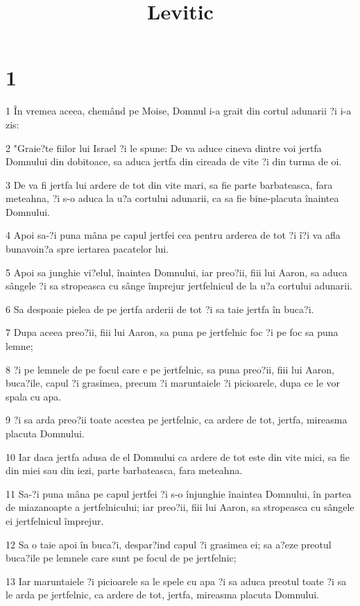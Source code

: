 

\title{Levitic}


\chapter{1}

\par 1 În vremea aceea, chemând pe Moise, Domnul i-a grait din cortul adunarii ?i i-a zis:
\par 2 "Graie?te fiilor lui Israel ?i le spune: De va aduce cineva dintre voi jertfa Domnului din dobitoace, sa aduca jertfa din cireada de vite ?i din turma de oi.
\par 3 De va fi jertfa lui ardere de tot din vite mari, sa fie parte barbateasca, fara meteahna, ?i s-o aduca la u?a cortului adunarii, ca sa fie bine-placuta înaintea Domnului.
\par 4 Apoi sa-?i puna mâna pe capul jertfei cea pentru arderea de tot ?i î?i va afla bunavoin?a spre iertarea pacatelor lui.
\par 5 Apoi sa junghie vi?elul, înaintea Domnului, iar preo?ii, fiii lui Aaron, sa aduca sângele ?i sa stropeasca cu sânge împrejur jertfelnicul de la u?a cortului adunarii.
\par 6 Sa despoaie pielea de pe jertfa arderii de tot ?i sa taie jertfa în buca?i.
\par 7 Dupa aceea preo?ii, fiii lui Aaron, sa puna pe jertfelnic foc ?i pe foc sa puna lemne;
\par 8 ?i pe lemnele de pe focul care e pe jertfelnic, sa puna preo?ii, fiii lui Aaron, buca?ile, capul ?i grasimea, precum ?i maruntaiele ?i picioarele, dupa ce le vor spala cu apa.
\par 9 ?i sa arda preo?ii toate acestea pe jertfelnic, ca ardere de tot, jertfa, mireasma placuta Domnului.
\par 10 Iar daca jertfa adusa de el Domnului ca ardere de tot este din vite mici, sa fie din miei sau din iezi, parte barbateasca, fara meteahna.
\par 11 Sa-?i puna mâna pe capul jertfei ?i s-o înjunghie înaintea Domnului, în partea de miazanoapte a jertfelnicului; iar preo?ii, fiii lui Aaron, sa stropeasca cu sângele ei jertfelnicul împrejur.
\par 12 Sa o taie apoi în buca?i, despar?ind capul ?i grasimea ei; sa a?eze preotul buca?ile pe lemnele care sunt pe focul de pe jertfelnic;
\par 13 Iar maruntaiele ?i picioarele sa le spele cu apa ?i sa aduca preotul toate ?i sa le arda pe jertfelnic, ca ardere de tot, jertfa, mireasma placuta Domnului.
